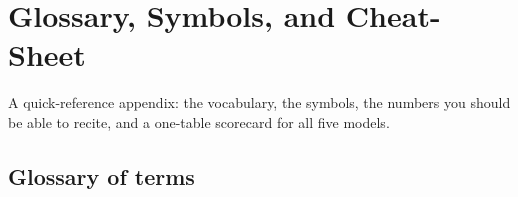 \chapter{Glossary, Symbols, and Cheat-Sheet}
\label{app:glossary}

A quick-reference appendix: the vocabulary, the symbols, the numbers you should be able to recite, and
a one-table scorecard for all five models.

\section{Glossary of terms}
\label{app:glossary:terms}

